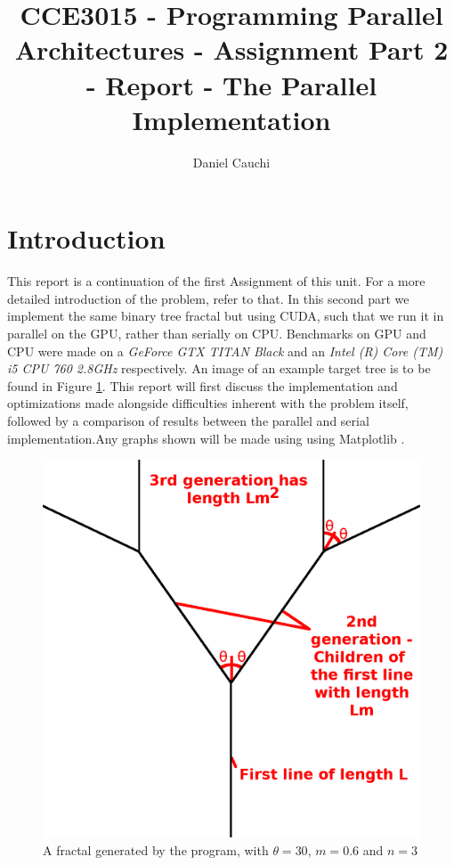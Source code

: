 \documentclass[11pt]{article}
\begin{document}
\title{CCE3015 - Programming Parallel Architectures - Assignment Part 2 - Report - The Parallel Implementation}
\author{Daniel Cauchi}
\date{}
\maketitle

\section{Introduction} \label{intro}
This report is a continuation of the first Assignment of this unit. For a more detailed introduction of the problem, refer to that. In this second part we implement the same binary tree fractal but using CUDA, such that we run it in parallel on the GPU, rather than serially on CPU. Benchmarks on GPU and CPU were made on a \textit{GeForce GTX TITAN Black} and an \textit{Intel (R) Core (TM) i5 CPU 760 2.8GHz} respectively. An image of an example target tree is to be found in Figure \ref{general explanation}. This report will first discuss the implementation and optimizations made alongside difficulties inherent with the problem itself, followed by a comparison of results between the parallel and serial implementation.Any graphs shown will be made using using Matplotlib \cite{matplotlib}.

\begin{figure}
	\includegraphics[width=.95\linewidth]{Images/GeneralExplanation.png}
	\centering
	\caption{A fractal generated by the program, with $\theta=30$, $m=0.6$ and $n=3$}
	\label{general explanation}
\end{figure}
\end{document}
